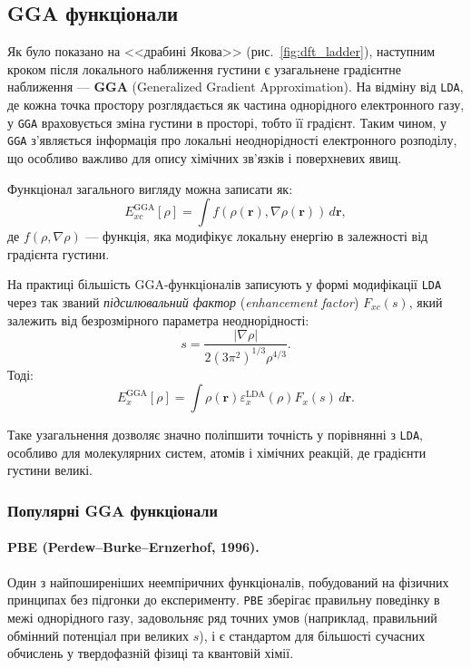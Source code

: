 \subsection{GGA функціонали}

Як було показано на <<драбині Якова>> (рис.~\ref{fig:dft_ladder}), наступним кроком після локального наближення густини є узагальнене градієнтне наближення --- \textbf{GGA} (Generalized Gradient Approximation).
На відміну від \texttt{LDA}, де кожна точка простору розглядається як частина однорідного електронного газу, у \texttt{GGA} враховується зміна густини в просторі, тобто її градієнт.
Таким чином, у \texttt{GGA} з’являється інформація про локальні неоднорідності електронного розподілу, що особливо важливо для опису хімічних зв’язків і поверхневих явищ.

Функціонал загального вигляду можна записати як:
\begin{equation}
E_{xc}^{\text{GGA}}[\rho] = \int f(\rho(\mathbf{r}), \nabla\rho(\mathbf{r}))\, d\mathbf{r},
\end{equation}
де $f(\rho, \nabla\rho)$ --- функція, яка модифікує локальну енергію в залежності від градієнта густини.

На практиці більшість GGA-функціоналів записують у формі модифікації \texttt{LDA} через так званий \emph{підсилювальний фактор} (\textit{enhancement factor}) $F_{xc}(s)$, який залежить від безрозмірного параметра неоднорідності:
\[
s = \frac{|\nabla\rho|}{2(3\pi^2)^{1/3}\rho^{4/3}}.
\]
Тоді:
\[
E_{x}^{\text{GGA}}[\rho] = \int \rho(\mathbf{r}) \varepsilon_{x}^{\text{LDA}}(\rho) F_x(s)\, d\mathbf{r}.
\]

Таке узагальнення дозволяє значно поліпшити точність у порівнянні з \texttt{LDA}, особливо для молекулярних систем, атомів і хімічних реакцій, де градієнти густини великі.

\subsubsection{Популярні GGA функціонали}

\paragraph{PBE (Perdew–Burke–Ernzerhof, 1996).}
Один з найпоширеніших неемпіричних функціоналів, побудований на фізичних принципах без підгонки до експерименту.
\texttt{PBE} зберігає правильну поведінку в межі однорідного газу, задовольняє ряд точних умов (наприклад, правильний обмінний потенціал при великих $s$), і є стандартом для більшості сучасних обчислень у твердофазній фізиці та квантовій хімії.

